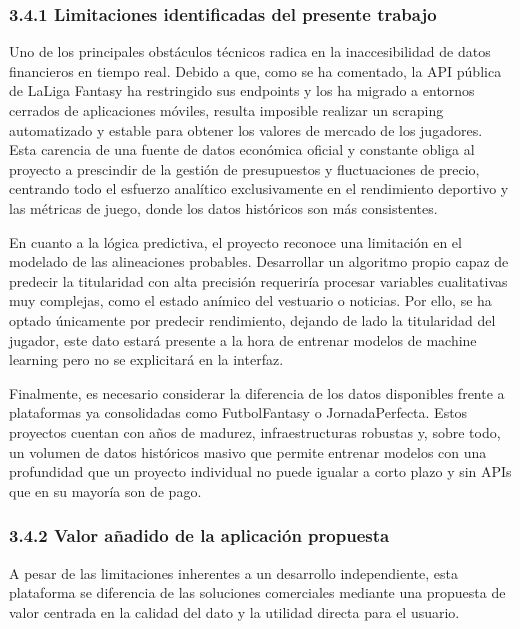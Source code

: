 \subsubsection{3.4.1 Limitaciones identificadas del presente trabajo}

Uno de los principales obstáculos técnicos radica en la inaccesibilidad de datos financieros en tiempo 
real. Debido a que, como se ha comentado, la API pública de LaLiga Fantasy ha restringido sus 
endpoints y los ha migrado a entornos cerrados de aplicaciones móviles, resulta imposible realizar un 
scraping automatizado y estable para obtener los valores de mercado de los jugadores. Esta carencia 
de una fuente de datos económica oficial y constante obliga al proyecto a prescindir de la gestión de 
presupuestos y fluctuaciones de precio, centrando todo el esfuerzo analítico exclusivamente en el 
rendimiento deportivo y las métricas de juego, donde los datos históricos son más consistentes.

En cuanto a la lógica predictiva, el proyecto reconoce una limitación en el modelado de las 
alineaciones probables. Desarrollar un algoritmo propio capaz de predecir la titularidad con alta 
precisión requeriría procesar variables cualitativas muy complejas, como el estado anímico del 
vestuario o noticias. Por ello, se ha optado únicamente por predecir rendimiento, dejando de lado la 
titularidad del jugador, este dato estará presente a la hora de entrenar modelos de machine learning 
pero no se explicitará en la interfaz.

Finalmente, es necesario considerar la diferencia de los datos disponibles frente a plataformas ya 
consolidadas como FutbolFantasy o JornadaPerfecta. Estos proyectos cuentan con años de madurez, 
infraestructuras robustas y, sobre todo, un volumen de datos históricos masivo que permite entrenar 
modelos con una profundidad que un proyecto individual no puede igualar a corto plazo y sin APIs que 
en su mayoría son de pago.

\subsubsection{3.4.2 Valor añadido de la aplicación propuesta}

A pesar de las limitaciones inherentes a un desarrollo independiente, esta plataforma se diferencia de 
las soluciones comerciales mediante una propuesta de valor centrada en la calidad del dato y la 
utilidad directa para el usuario.

